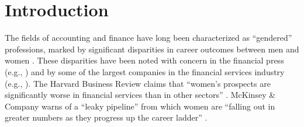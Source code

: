 \documentclass[11pt]{article}
\begin{document}
\newpage
{}
\normalsize
\doublespacing

\section{Introduction} \label{section:Intro}
    The fields of accounting and finance have long been characterized as ``gendered'' professions, marked by significant disparities in career outcomes between men and women \parencite{daltonWomenManagersPartners1997, hardiesGenderDiscriminationEvidence2021, condieDoesgenderEthnicDiversity2023}. These disparities have been noted with concern in the financial press (e.g., \cite{rapoportWomenRarelyRun2018,jaekelWhyWomenArent2016}) and by some of the largest companies in the financial services industry (e.g., \cite{deloitteLeadershipRepresentationGender2022}). The Harvard Business Review claims that ``women's prospects are significantly worse in financial services than in other sectors'' \parencite{jaekelWhyWomenArent2016}. McKinsey \& Company warns of a ``leaky pipeline'' from which women are ``falling out in greater numbers as they progress up the career ladder''  \parencite{ellingrudkweilinClosingGenderRace2021}. 
    
\end{document}
